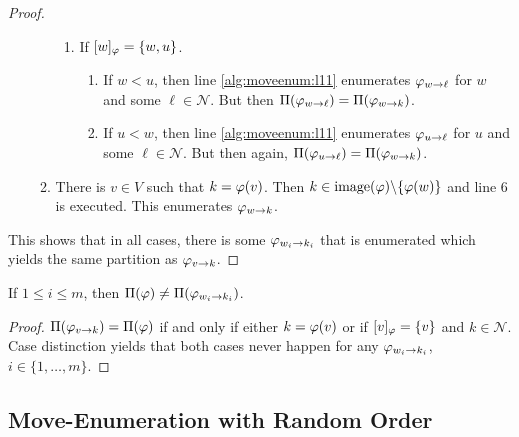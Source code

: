 \begin{proof}
\begin{enumerate}
\begin{enumerate}
\begin{enumerate}
                \item If $[w]_\varphi = \{w,u\}$. 
                \begin{enumerate}
                    \item If $w < u$, then line \ref{alg:moveenum:l11} enumerates $\varphi_{w\rightarrow \ell}$ for $w$ and some $\ell \in \mathcal{N}$. But then $\Pi(\varphi_{w\rightarrow \ell}) = \Pi(\varphi_{w\rightarrow k})$.
                    \item If $u < w$, then line \ref{alg:moveenum:l11} enumerates $\varphi_{u\rightarrow \ell}$ for $u$ and some $\ell \in \mathcal{N}$. But then again, $\Pi(\varphi_{u\rightarrow \ell}) = \Pi(\varphi_{w\rightarrow k})$.
                \end{enumerate} 
            \end{enumerate}
            \item There is $v \in V$ such that $k = \varphi(v)$. Then $k \in \mathrm{image}(\varphi)\backslash \{ \varphi(w) \}$ and line 6 is executed. This enumerates $\varphi_{w\rightarrow k}$.
        \end{enumerate}
    \end{enumerate}
    This shows that in all cases, there is some $\varphi_{w_i\rightarrow k_i}$ that is enumerated which yields the same partition as $\varphi_{v\rightarrow k}$.
\end{proof}

\begin{samepage}
    \begin{lemmarep}
        If $1 \leq i \leq m$, then $\Pi(\varphi) \neq \Pi(\varphi_{w_i\rightarrow k_i})$. \label{lemma:self_neighbour}
    \end{lemmarep}
\end{samepage}
\begin{proof}
    $\Pi(\varphi_{v\rightarrow k}) = \Pi(\varphi)$ if and only if either $k=\varphi(v)$ or if $[v]_\varphi = \{v\}$ and $k \in \mathcal{N}$. Case distinction yields that both cases never happen for any $\varphi_{w_i\rightarrow k_i}$, $i\in \{1,\dots,m\}$.
\end{proof}

\subsection{Move-Enumeration with Random Order}\label{sec:random_move_order}

